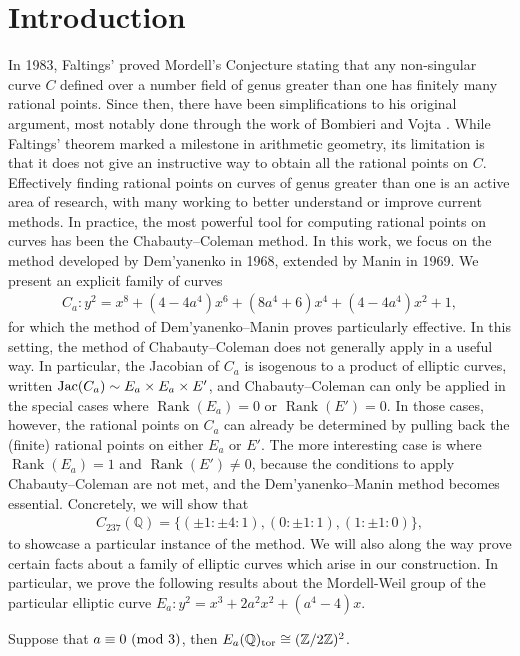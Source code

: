 \documentclass{article}
\newenvironment{manualproposition}[1]{%
  \IfBlankTF{#1}
    {\renewcommand{\themanualpropinner}{\unskip}}
    {\renewcommand\themanualpropinner{#1}}%
  \manualpropinner
}{\endmanualpropinner}
\newcommand{\Q}{\mathbb{Q}}
\newcommand{\Z}{\mathbb{Z}}
\theoremstyle{definition}
\newcommand{\Jac}{\textnormal{Jac}}
\DeclareMathOperator{\Rank}{Rank}
\begin{document}
\section{Introduction}
In 1983, Faltings' \cite{faltings1983endlichkeitssatze} proved Mordell's Conjecture stating that any non-singular curve $C$ defined over a number field of genus greater than one has finitely many rational points. Since then, there have been simplifications to his original argument, most notably done through the work of Bombieri \cite{bombieri1990mordell} and Vojta \cite{vojta1991siegel}. While Faltings' theorem marked a milestone in arithmetic geometry, its limitation is that it does not give an instructive way to obtain all the rational points on $C$. Effectively finding rational points on curves of genus greater than one is an active area of research, with many working to better understand or improve current methods. In practice, the most powerful tool for computing rational points on curves has been the Chabauty--Coleman method. In this work, we focus on the method developed by Dem'yanenko \cite{dem1966rational} in 1968, extended by Manin \cite{manin1969p} in 1969. We present an explicit family of curves 
\begin{eqnarray*}
    C_a \colon y^2 = x^8 + (4-4a^4) x^6 + (8a^4 + 6)x^4 + (4-4a^4)x^2 + 1,
\end{eqnarray*}
for which the method of Dem'yanenko--Manin proves particularly effective. In this setting, the method of Chabauty--Coleman does not generally apply in a useful way. In particular, the Jacobian of $C_a$ is isogenous to a product of elliptic curves, written $\Jac(C_a) \sim E_a \times E_a \times E'$, and Chabauty--Coleman can only be applied in the special cases where $\Rank(E_a) = 0$ or $\Rank(E') = 0$. In those cases, however, the rational points on $C_a$ can already be determined by pulling back the (finite) rational points on either $E_a$ or $E'$. The more interesting case is where $\Rank(E_a) = 1$ and $\Rank(E') \neq 0$, because the conditions to apply Chabauty--Coleman are not met, and the Dem'yanenko--Manin method becomes essential. Concretely, we will show that
\begin{eqnarray*}
    C_{237}(\Q) = \{(\pm1 : \pm 4: 1), (0: \pm 1: 1), (1: \pm1 : 0)\},
\end{eqnarray*}
to showcase a particular instance of the method. We will also along the way prove certain facts about a family of elliptic curves which arise in our construction. In particular, we prove the following results about the Mordell-Weil group of the particular elliptic curve $E_a \colon y^2 = x^3 + 2a^2x^2 + (a^4-4)x$.
\begin{manualproposition}{1}
    Suppose that $a \equiv 0 \textnormal{ (mod 3)}$, then $E_a(\Q)_\textnormal{tor} \cong (\Z/2\Z)^2$.
\end{manualproposition}
\end{document}
